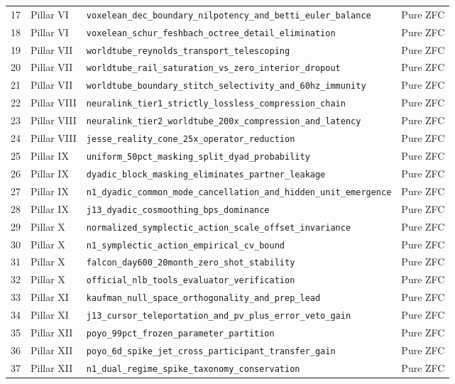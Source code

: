 \documentclass[11pt,letterpaper]{article}
\newcommand{\lean}[1]{\nolinkurl{#1}}
\theoremstyle{definition}
\begin{document}
\begin{footnotesize}
\begin{longtable}{@{}rl>{\raggedright\arraybackslash}p{3.95in}l@{}}
17 & Pillar VI & \lean{voxelean_dec_boundary_nilpotency_and_betti_euler_balance} & Pure ZFC \\
18 & Pillar VI & \lean{voxelean_schur_feshbach_octree_detail_elimination} & Pure ZFC \\
19 & Pillar VII & \lean{worldtube_reynolds_transport_telescoping} & Pure ZFC \\
20 & Pillar VII & \lean{worldtube_rail_saturation_vs_zero_interior_dropout} & Pure ZFC \\
21 & Pillar VII & \lean{worldtube_boundary_stitch_selectivity_and_60hz_immunity} & Pure ZFC \\
22 & Pillar VIII & \lean{neuralink_tier1_strictly_lossless_compression_chain} & Pure ZFC \\
23 & Pillar VIII & \lean{neuralink_tier2_worldtube_200x_compression_and_latency} & Pure ZFC \\
24 & Pillar VIII & \lean{jesse_reality_cone_25x_operator_reduction} & Pure ZFC \\
25 & Pillar IX & \lean{uniform_50pct_masking_split_dyad_probability} & Pure ZFC \\
26 & Pillar IX & \lean{dyadic_block_masking_eliminates_partner_leakage} & Pure ZFC \\
27 & Pillar IX & \lean{n1_dyadic_common_mode_cancellation_and_hidden_unit_emergence} & Pure ZFC \\
28 & Pillar IX & \lean{j13_dyadic_cosmoothing_bps_dominance} & Pure ZFC \\
29 & Pillar X & \lean{normalized_symplectic_action_scale_offset_invariance} & Pure ZFC \\
30 & Pillar X & \lean{n1_symplectic_action_empirical_cv_bound} & Pure ZFC \\
31 & Pillar X & \lean{falcon_day600_20month_zero_shot_stability} & Pure ZFC \\
32 & Pillar X & \lean{official_nlb_tools_evaluator_verification} & Pure ZFC \\
33 & Pillar XI & \lean{kaufman_null_space_orthogonality_and_prep_lead} & Pure ZFC \\
34 & Pillar XI & \lean{j13_cursor_teleportation_and_pv_plus_error_veto_gain} & Pure ZFC \\
35 & Pillar XII & \lean{poyo_99pct_frozen_parameter_partition} & Pure ZFC \\
36 & Pillar XII & \lean{poyo_6d_spike_jet_cross_participant_transfer_gain} & Pure ZFC \\
37 & Pillar XII & \lean{n1_dual_regime_spike_taxonomy_conservation} & Pure ZFC \\

\end{longtable}
\end{footnotesize}
\end{document}
